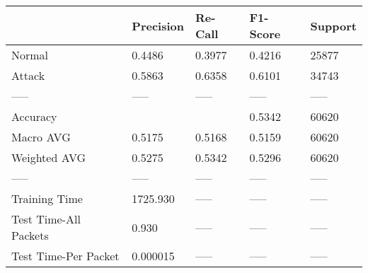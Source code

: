 \begin{tabular}{lllll}
\toprule
{} & Precision & Re-Call & F1-Score & Support \\
\midrule
Normal                &    0.4486 &  0.3977 &   0.4216 &   25877 \\
Attack                &    0.5863 &  0.6358 &   0.6101 &   34743 \\
-----                 &     ----- &   ----- &    ----- &   ----- \\
Accuracy              &           &         &   0.5342 &   60620 \\
Macro AVG             &    0.5175 &  0.5168 &   0.5159 &   60620 \\
Weighted AVG          &    0.5275 &  0.5342 &   0.5296 &   60620 \\
-----                 &     ----- &   ----- &    ----- &   ----- \\
Training Time         &  1725.930 &   ----- &    ----- &   ----- \\
Test Time-All Packets &     0.930 &   ----- &    ----- &   ----- \\
Test Time-Per Packet  &  0.000015 &   ----- &    ----- &   ----- \\
\bottomrule
\end{tabular}
